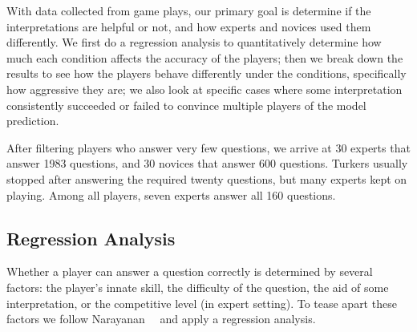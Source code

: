 With data collected from game plays, our primary goal is determine if
the interpretations are helpful or not, and how experts and novices
used them differently.
We first do a regression analysis to
quantitatively determine how much each condition affects the
accuracy of the players; then we break down the results to see
how the players behave differently under the conditions, specifically
how aggressive they are; we also look at specific cases where some
interpretation consistently succeeded or failed to convince multiple
players of the model prediction.

After filtering players who answer very few questions, we arrive at
30 experts that answer 1983 questions, and 30 novices that answer
600 questions. Turkers usually stopped after answering the required
twenty questions, but many experts kept on playing. Among all players,
seven experts answer all 160 questions.

\subsection{Regression Analysis}

Whether a player can answer a question correctly is determined by
several factors: the player's innate skill, the difficulty of the
question, the aid of some interpretation, or the competitive level (in
expert setting).  To tease apart these factors we follow
Narayanan~\etal{}~\cite{narayanan2018humans} and apply a regression
analysis.

